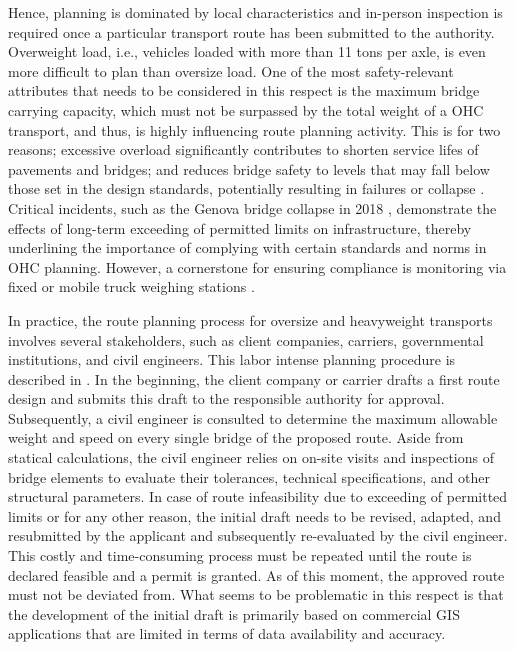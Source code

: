 Hence, planning is dominated by local characteristics and in-person inspection is required once a particular transport route has been submitted to the authority.
Overweight load, i.e., vehicles loaded with more than 11 tons per axle, is even more difficult to plan than oversize load.
One of the most safety-relevant attributes that needs to be considered in this respect is the maximum bridge carrying capacity, which must not be surpassed by the total weight of a OHC transport, and thus, is highly influencing route planning activity.
This is for two reasons; excessive overload significantly contributes to shorten service lifes of pavements and bridges; and reduces bridge safety to levels that may fall below those set in the design standards, potentially resulting in failures or collapse \cite{fiorillo2018fragility, yan2018optimal, ghosn2000development}.
Critical incidents, such as the Genova bridge collapse in 2018 \cite{Morgese.2020, MorandiNYTimes},  demonstrate the effects of long-term exceeding of permitted limits on infrastructure, thereby underlining the importance of complying with certain standards and norms in OHC planning. However, a cornerstone for ensuring compliance is monitoring via fixed or mobile truck weighing stations \cite{fiorillo2016minimizing}.
\par In practice, the route planning process for oversize and heavyweight transports involves several stakeholders, such as client companies, carriers, governmental institutions, and civil engineers.
This labor intense planning procedure is described in \cite{Osegueda.1999}. In the beginning, the client company or carrier drafts a first route design and submits this draft to the responsible authority for approval.
Subsequently, a civil engineer is consulted to determine the maximum allowable weight and speed on every single bridge of the proposed route.
Aside from statical calculations, the civil engineer relies on on-site visits and inspections of bridge elements to evaluate their tolerances, technical specifications, and other structural parameters.
In case of route infeasibility due to exceeding of permitted limits or for any other reason, the initial draft needs to be revised, adapted, and resubmitted by the applicant and subsequently re-evaluated by the civil engineer.
This costly and time-consuming process must be repeated until the route is declared feasible and a permit is granted. As of this moment, the approved route must not be deviated from.
What seems to be problematic in this respect is that the development of the initial draft is primarily based on commercial GIS applications that are limited in terms of data availability and accuracy.
